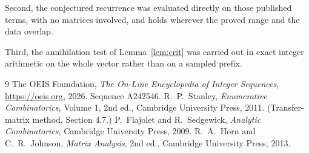 \documentclass[11pt,a4paper]{article}
\theoremstyle{plain}
\theoremstyle{definition}
\begin{document}
Second, the conjectured recurrence was evaluated directly on those published terms, with no
matrices involved, and holds wherever the proved range and the data overlap.

Third, the annihilation test of Lemma~\ref{lem:crit} was carried out in exact integer
arithmetic on the whole vector rather than on a sampled prefix.

\begin{thebibliography}{9}
 The OEIS Foundation, \emph{The On-Line Encyclopedia of Integer
Sequences}, \url{https://oeis.org}, 2026. Sequence A242546.
 R.~P.~Stanley, \emph{Enumerative Combinatorics}, Volume 1, 2nd ed.,
Cambridge University Press, 2011. (Transfer-matrix method, Section 4.7.)
 P.~Flajolet and R.~Sedgewick, \emph{Analytic Combinatorics}, Cambridge
University Press, 2009.
 R.~A.~Horn and C.~R.~Johnson, \emph{Matrix Analysis}, 2nd ed., Cambridge
University Press, 2013.
\end{thebibliography}
\end{document}
